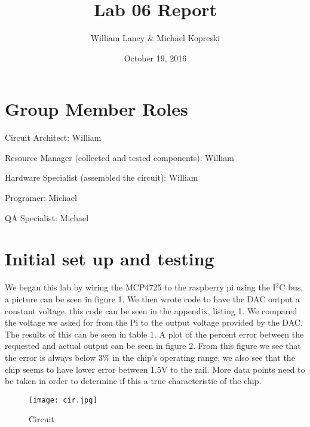 \documentclass[prl,12pt,notitlepage,aps,onecolumn,superscriptaddress]{revtex4-1}
\begin{document}
\title{Lab 06 Report}
\author{William Laney \& Michael Kopreski}
\date{October 19, 2016}
\maketitle

\section{Group Member Roles}
Circuit Architect: William

Resource Manager (collected and tested components): William

Hardware Specialist (assembled the circuit): William

Programer: Michael

QA Specialist: Michael

\section{Initial set up and testing}
We began this lab by wiring the MCP4725 to the raspberry pi using the I$^2$C bus, a picture can be seen in figure 1. We then wrote code to have the DAC output a constant voltage, this code can be seen in the appendix, listing 1. We compared the voltage we asked for from the Pi to the output voltage provided by the DAC. The results of this can be seen in table 1. A plot of the percent error between the requested and actual output can be seen in figure 2. From this figure we see that the error is always below 3\% in the chip's operating range, we also see that the chip seems to have lower error between 1.5V to the rail. More data points need to be taken in order to determine if this a true characteristic of the chip.

\begin{figure}[h]
\begin{center}
\texttt{[image: cir.jpg]}
\end{center}
\caption{\label{fig:pic} Circuit}
\end{figure}
\end{document}
